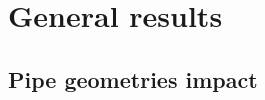 \documentclass[a4paper, 11pt]{report}
\begin{document}





\section{General results} \label{sec:general}

\subsection{Pipe geometries impact}
\end{document}
